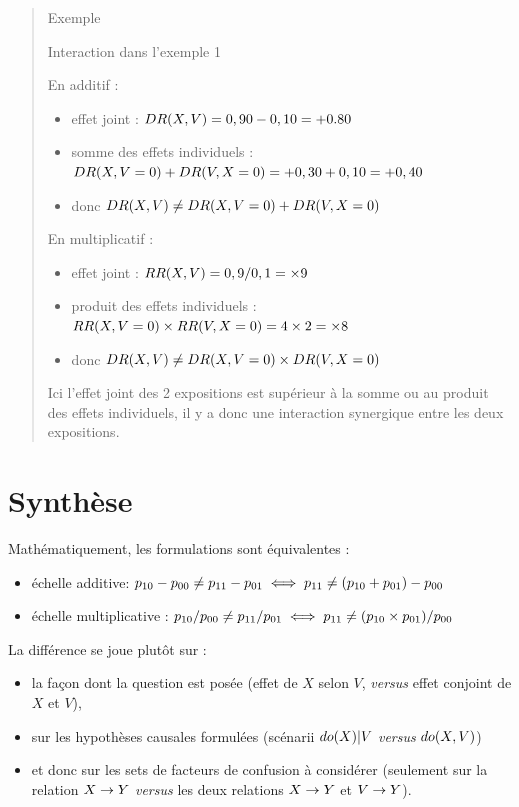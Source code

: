 \documentclass[
]{book}
\providecommand{\tightlist}{%
  \setlength{\itemsep}{0pt}\setlength{\parskip}{0pt}}
\begin{document}
\begin{quote}
Exemple

Interaction dans l'exemple 1

En additif :

\begin{itemize}
\tightlist
\item
  effet joint : \(\small DR(X,V) = 0,90 - 0,10 = +0.80\)
\item
  somme des effets individuels : \(\small DR(X,V=0) + DR(V,X=0) = +0,30 +0,10 = +0,40\)
\item
  donc \(\small DR(X,V) \neq DR(X,V=0) + DR(V,X=0)\)
\end{itemize}

En multiplicatif :

\begin{itemize}
\tightlist
\item
  effet joint : \(\small RR(X,V) = 0,9/0,1 = \times 9\)
\item
  produit des effets individuels : \(\small RR(X,V=0) \times RR(V,X=0) = 4 \times 2 = \times 8\)
\item
  donc \(\small DR(X,V) \neq DR(X,V=0) \times DR(V,X=0)\)
\end{itemize}

Ici l'effet joint des 2 expositions est supérieur à la somme ou au produit des effets individuels, il y a donc une interaction synergique entre les deux expositions.
\end{quote}

\hypertarget{synthuxe8se}{%
\section{Synthèse}\label{synthuxe8se}}

Mathématiquement, les formulations sont équivalentes :

\begin{itemize}
\tightlist
\item
  échelle additive: \(\small p_{10} -p_{00} \neq p_{11}- p_{01} \iff p_{11} \neq (p_{10}+p_{01})- p_{00}\)
\item
  échelle multiplicative : \(\small p_{10} /p_{00} \neq p_{11}/ p_{01} \iff p_{11} \neq (p_{10} \times p_{01})/p_{00}\)
\end{itemize}

La différence se joue plutôt sur :

\begin{itemize}
\tightlist
\item
  la façon dont la question est posée (effet de \(X\) selon \(V\), \emph{versus} effet conjoint de \(X\) et \(V\)),
\item
  sur les hypothèses causales formulées (scénarii \(\small do(X)|V\) \emph{versus} \(\small do(X,V)\))
\item
  et donc sur les sets de facteurs de confusion à considérer (seulement sur la relation \(\small X \rightarrow Y\) \emph{versus} les deux relations \(\small X \rightarrow Y\) et \(\small V \rightarrow Y\)).
\end{itemize}
\end{document}
